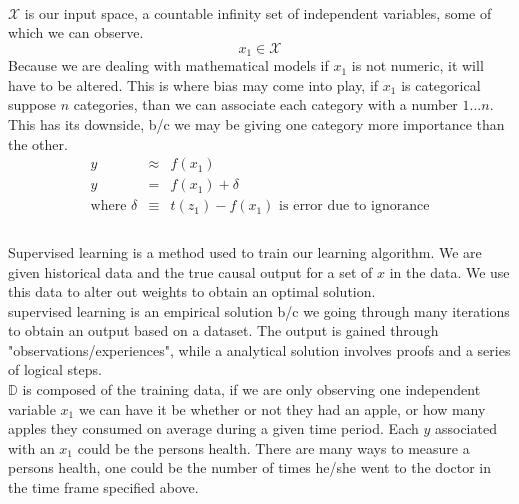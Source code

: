 \documentclass[12pt]{article}
\begin{document}
\begin{enumerate}
\\$\mathcal{X}$ is our input space, a countable infinity set of independent variables, some of which we can observe. $$x_{1} \in \mathcal{X}$$ Because we are dealing with mathematical models if $x_{1}$ is not numeric, it will have to be altered. This is where bias may come into play, if $x_1$ is categorical suppose $n$ categories, than we can associate each category with a number ${1}...{n}$. This has its downside, b/c we may be giving one category more importance than the other.
\begin{eqnarray*}
y&\approx& f(x_{1})\\
y&=&f(x_{1})+\delta  \\
\text{where } \delta &\equiv& t(z_{1}) - f(x_{1}) \text{ is error due to ignorance}\\
\end{eqnarray*}
\\Supervised learning is a method used to train our learning algorithm. We are given historical data and the true causal output for a set of $x$ in the data. We use this data to alter out weights to obtain an optimal solution.
\\supervised learning is an empirical solution b/c we going through many iterations to obtain an output based on a dataset. The output is gained through "observations/experiences", while a  analytical solution involves proofs and a series of logical steps. 
\\$\mathbb{D}$ is composed of the training data, if we are only observing one independent variable $x_1$ we can have it be whether or not they had an apple, or how many apples they consumed on average during a given time period. Each $y$ associated with an $x_1$ could be the persons health. There are many ways to measure a persons health, one could be the number of times he/she went to the doctor in the time frame specified above. 

\end{enumerate}
\end{document}
